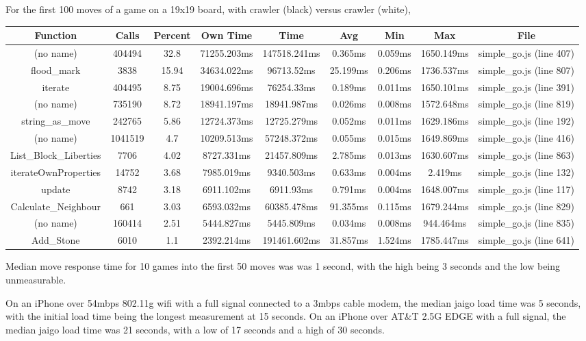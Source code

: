 \documentclass{memoir}
\begin{document}
For the first 100 moves of a game on a 19x19 board, with crawler (black) versus crawler (white),

\begin{tabular}{ccccccccc}
	\hline
	Function & Calls & Percent & Own Time & Time & Avg & Min & Max & File\\	
\hline
(no name) &	404494 &	32.8 &	71255.203ms &	147518.241ms &	0.365ms &	0.059ms &	1650.149ms &	simple\_go.js (line 407)\\
\hline
flood\_mark &	3838 &	15.94 &	34634.022ms &	96713.52ms &	25.199ms &	0.206ms &	1736.537ms &	simple\_go.js (line 807)\\
\hline
iterate &	404495 &	8.75 &	19004.696ms &	76254.33ms &	0.189ms &	0.011ms &	1650.101ms &	simple\_go.js (line 391)\\
\hline
(no name) &	735190 &	8.72 &	18941.197ms &	18941.987ms &	0.026ms &	0.008ms &	1572.648ms &	simple\_go.js (line 819)\\
\hline
string\_as\_move &	242765 &	5.86 &	12724.373ms	& 12725.279ms &	0.052ms &	0.011ms &	1629.186ms &	simple\_go.js (line 192)\\
\hline
(no name) &	1041519 &	4.7 &	10209.513ms &	57248.372ms &	0.055ms &	0.015ms &	1649.869ms &	simple\_go.js (line 416)\\
\hline
List\_Block\_Liberties &	7706 &	4.02 &	8727.331ms &	21457.809ms &	2.785ms &	0.013ms &	1630.607ms &	simple\_go.js (line 863)\\
\hline
iterateOwnProperties &	14752 &	3.68 &	7985.019ms &	9340.503ms &	0.633ms &	0.004ms &	2.419ms &	simple\_go.js (line 132)\\
\hline
update &	8742 &	3.18 &	6911.102ms &	6911.93ms &	0.791ms &	0.004ms &	1648.007ms &	simple\_go.js (line 117)\\
\hline
Calculate\_Neighbour &	661 &	3.03 &	6593.032ms &	60385.478ms &	91.355ms &	0.115ms &	1679.244ms &	simple\_go.js (line 829)\\
\hline
(no name) &	160414 &	2.51 &	5444.827ms &	5445.809ms &	0.034ms	& 0.008ms &	944.464ms &	simple\_go.js (line 835)\\
\hline
Add\_Stone &	6010 &	1.1 &	2392.214ms	& 191461.602ms	& 31.857ms &	1.524ms &	1785.447ms &	simple\_go.js (line 641)\\
\hline
\end{tabular}


Median move response time for 10 games into the first 50 moves was was 1 second, with the high being 3 seconds and the low being unmeasurable.

On an iPhone over 54mbps 802.11g wifi with a full signal connected to a 3mbps cable modem, the median jaigo load time was 5 seconds, with the initial load time being the longest measurement at 15 seconds. On an iPhone over AT\&T 2.5G EDGE with a full signal, the median jaigo load time was 21 seconds, with a low of 17 seconds and a high of 30 seconds.
\end{document}
